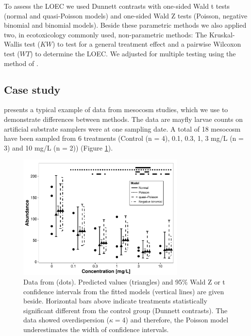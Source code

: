 \documentclass[twocolumn, natbib]{svjour3}
\begin{document}
To assess the LOEC we used Dunnett contrasts \citep{dunnett_multiple_1955} with one-sided Wald t tests (normal and quasi-Poisson models) and one-sided Wald Z tests (Poisson, negative binomial and binomial models).
Beside these parametric methods we also applied two, in ecotoxicology commonly used, non-parametric methods: The Kruskal-Wallis test  ($KW$) to test for a general treatment effect and a pairwise Wilcoxon test ($WT$) to determine the LOEC.
We adjusted for multiple testing using the method of \citet{holm_simple_1979}.



\subsection{Case study}
\citet{brock_minimum_2015} presents a typical example of data from mesocosm studies, which we use to demonstrate differences between methods.
The data are mayfly larvae counts on artificial substrate samplers were at one sampling date. 
A total of 18 mesocosm have been sampled from 6 treatments (Control (n = 4), 0.1, 0.3, 1, 3 mg/L (n = 3) and 10 mg/L (n = 2)) (Figure \ref{fig:example}).

\begin{figure}[h]
  \centering
  \includegraphics[width = 84mm]{example.pdf}
  \caption{Data from \citet{brock_minimum_2015} (dots). 
  Predicted values (triangles) and 95\% Wald Z or t confidence intervals from the fitted models (vertical lines) are given beside.
  Horizontal bars above indicate treatments statistically significant different from the control group (Dunnett contrasts).
  The data showed overdispersion ($\kappa = 4$) and therefore, the Poisson model underestimates the width of confidence intervals.
  }
  \label{fig:example}
\end{figure}


\end{document}
